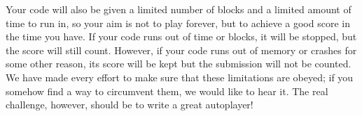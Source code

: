 \documentclass{article}
\begin{document}
Your code will also be given a limited number of blocks and a limited
amount of time to run in, so your aim is not to play forever, but to
achieve a good score in the time you have. If your code runs out of
time or blocks, it will be stopped, but the score will still
count. However, if your code runs out of memory or crashes for some
other reason, its score will be kept but the submission will not be
counted.  We have made every effort to make sure that these
limitations are obeyed; if you somehow find a way to circumvent them,
we would like to hear it. The real challenge, however, should be to
write a great autoplayer! 
\end{document}
